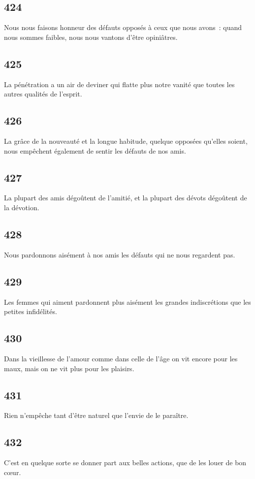 \documentclass[french,twoside]{book} %
\begin{document}
\subsection[{424}]{ \textsc{424} }
\noindent Nous nous faisons honneur des défauts opposés à ceux que nous avons : quand nous sommes faibles, nous nous vantons d’être opiniâtres.
\subsection[{425}]{ \textsc{425} }
\noindent La pénétration a un air de deviner qui flatte plus notre vanité que toutes les autres qualités de l’esprit.
\subsection[{426}]{ \textsc{426} }
\noindent La grâce de la nouveauté et la longue habitude, quelque opposées qu’elles soient, nous empêchent également de sentir les défauts de nos amis.
\subsection[{427}]{ \textsc{427} }
\noindent La plupart des amis dégoûtent de l’amitié, et la plupart des dévots dégoûtent de la dévotion.
\subsection[{428}]{ \textsc{428} }
\noindent Nous pardonnons aisément à nos amis les défauts qui ne nous regardent pas.
\subsection[{429}]{ \textsc{429} }
\noindent Les femmes qui aiment pardonnent plus aisément les grandes indiscrétions que les petites infidélités.
\subsection[{430}]{ \textsc{430} }
\noindent Dans la vieillesse de l’amour comme dans celle de l’âge on vit encore pour les maux, mais on ne vit plus pour les plaisirs.
\subsection[{431}]{ \textsc{431} }
\noindent Rien n’empêche tant d’être naturel que l’envie de le paraître.
\subsection[{432}]{ \textsc{432} }
\noindent C’est en quelque sorte se donner part aux belles actions, que de les louer de bon cœur.
\end{document}
